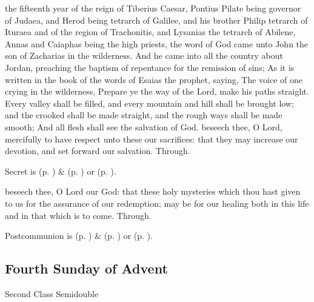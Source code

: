  the fifteenth year of the reign of Tiberius Caesar, Pontius Pilate being governor of Judaea, and Herod being tetrarch of Galilee, and his brother Philip tetrarch of Ituraea and of the region of Trachonitis, and Lysanias the tetrarch of Abilene, Annas and Caiaphas being the high priests, the word of God came unto John the son of Zacharias in the wilderness. And he came into all the country about Jordan, preaching the baptism of repentance for the remission of sins; As it is written in the book of the words of Esaias the prophet, saying, The voice of one crying in the wilderness, Prepare ye the way of the Lord, make his paths straight. Every valley shall be filled, and every mountain and hill shall be brought low; and the crooked shall be made straight, and the rough ways shall be made smooth; And all flesh shall see the salvation of God.
\secret
{} beseech thee, O Lord, mercifully to have respect unto these our sacrifices: that they may increase our devotion, and set forward our salvation. Through.
\begin{rubric}
     Secret is  (p. \pageref{SPMaryInAdvent}) \&   (p. \pageref{SPAgainst}) or  (p. \pageref{SPChiefBishop}).
\end{rubric}
\postcommunion
{} beseech thee, O Lord our God: that these holy mysteries which thou hast given to us for the assurance of our redemption; may be for our healing both in this life and in that which is to come. Through.
\begin{rubric}
     Postcommunion is  (p. \pageref{SPMaryInAdvent}) \&   (p. \pageref{SPAgainst}) or  (p. \pageref{SPChiefBishop}).
\end{rubric}


\subsection{Fourth Sunday of Advent}
\begin{inhead}
{Second Class Semidouble}
\end{inhead}
\fancyhead[RE,LO]{}

